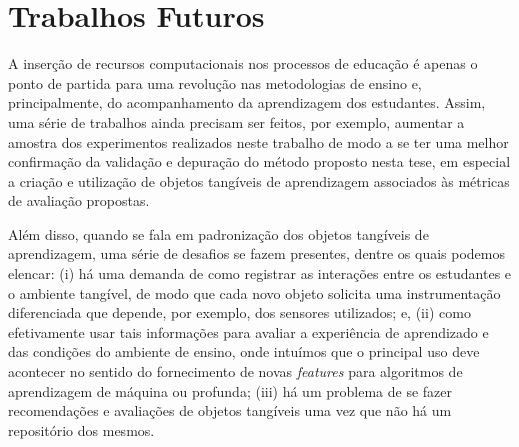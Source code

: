 \section{Trabalhos Futuros}

A inserção de recursos computacionais nos processos de educação é apenas o ponto de partida para uma revolução nas metodologias de ensino e, principalmente, do acompanhamento da aprendizagem dos estudantes. Assim, uma série de trabalhos ainda precisam ser feitos, por exemplo, aumentar a amostra dos experimentos realizados neste trabalho de modo a se ter uma melhor confirmação da validação e depuração do método proposto nesta tese, em especial a criação e utilização de objetos tangíveis de aprendizagem associados às métricas de avaliação propostas.


Além disso, quando se fala em padronização dos objetos tangíveis de aprendizagem, uma série de desafios se fazem presentes, dentre os quais podemos elencar: (i) há uma demanda de como registrar as interações entre os estudantes e o ambiente tangível, de modo que cada novo objeto solicita uma instrumentação diferenciada que depende, por exemplo, dos sensores utilizados; e, (ii) como efetivamente usar tais informações para avaliar a experiência de aprendizado e das condições do ambiente de ensino, onde intuímos que o principal uso deve acontecer no sentido do fornecimento de novas \textit{features} para algoritmos de aprendizagem de máquina ou profunda; (iii) há um problema de se fazer recomendações e avaliações de objetos tangíveis uma vez que não há um repositório dos mesmos.

